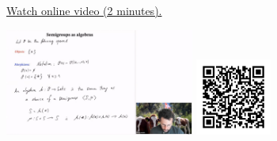 
\begin{minipage}{10cm}
    \href{https://act4e-spring21.netlify.app/videos/spring2021-operads-b:semigroups-algebras.html}{Watch online video (2 minutes).}
        
    \href{https://act4e-spring21.netlify.app/videos/spring2021-operads-b:semigroups-algebras.html}{\includegraphics[height=3.5cm]{spring2021-operads-b:semigroups-algebras/thumbnails.jpg}}
    \href{https://act4e-spring21.netlify.app/videos/spring2021-operads-b:semigroups-algebras.html}{\includegraphics[height=2.5cm]{spring2021-operads-b:semigroups-algebras/qrcode.png}}
\end{minipage}

